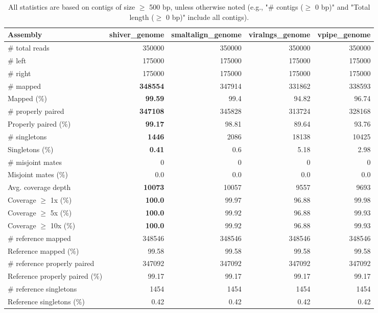 \documentclass[12pt,a4paper]{article}
\begin{document}
\begin{table}[ht]
\begin{center}
\caption{All statistics are based on contigs of size $\geq$ 500 bp, unless otherwise noted (e.g., "\# contigs ($\geq$ 0 bp)" and "Total length ($\geq$ 0 bp)" include all contigs).}
\begin{tabular}{|l*{4}{|r}|}
\hline
Assembly & shiver\_genome & smaltalign\_genome & viralngs\_genome & vpipe\_genome \\ \hline
\# total reads & 350000 & 350000 & 350000 & 350000 \\ \hline
\# left & 175000 & 175000 & 175000 & 175000 \\ \hline
\# right & 175000 & 175000 & 175000 & 175000 \\ \hline
\# mapped & {\bf 348554} & 347914 & 331862 & 338593 \\ \hline
Mapped (\%) & {\bf 99.59} & 99.4 & 94.82 & 96.74 \\ \hline
\# properly paired & {\bf 347108} & 345828 & 313724 & 328168 \\ \hline
Properly paired (\%) & {\bf 99.17} & 98.81 & 89.64 & 93.76 \\ \hline
\# singletons & {\bf 1446} & 2086 & 18138 & 10425 \\ \hline
Singletons (\%) & {\bf 0.41} & 0.6 & 5.18 & 2.98 \\ \hline
\# misjoint mates & 0 & 0 & 0 & 0 \\ \hline
Misjoint mates (\%) & 0.0 & 0.0 & 0.0 & 0.0 \\ \hline
Avg. coverage depth & {\bf 10073} & 10057 & 9557 & 9693 \\ \hline
Coverage $\geq$ 1x (\%) & {\bf 100.0} & 99.97 & 96.88 & 99.98 \\ \hline
Coverage $\geq$ 5x (\%) & {\bf 100.0} & 99.92 & 96.88 & 99.93 \\ \hline
Coverage $\geq$ 10x (\%) & {\bf 100.0} & 99.92 & 96.88 & 99.93 \\ \hline
\# reference mapped & 348546 & 348546 & 348546 & 348546 \\ \hline
Reference mapped (\%) & 99.58 & 99.58 & 99.58 & 99.58 \\ \hline
\# reference properly paired & 347092 & 347092 & 347092 & 347092 \\ \hline
Reference properly paired (\%) & 99.17 & 99.17 & 99.17 & 99.17 \\ \hline
\# reference singletons & 1454 & 1454 & 1454 & 1454 \\ \hline
Reference singletons (\%) & 0.42 & 0.42 & 0.42 & 0.42 \\ \hline

\end{tabular}
\end{center}
\end{table}
\end{document}
